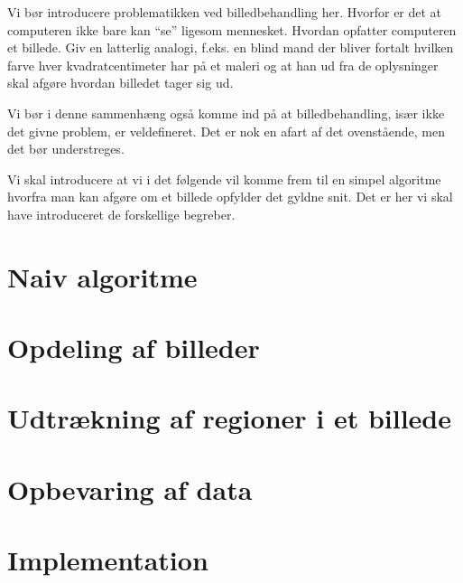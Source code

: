 {
{\sffamily Vi bør introducere problematikken ved billedbehandling her.
Hvorfor er det at computeren ikke bare kan ``se'' ligesom mennesket.
Hvordan opfatter computeren et billede. Giv en latterlig analogi, f.eks.
en blind mand der bliver fortalt hvilken farve hver kvadratcentimeter
har på et maleri og at han ud fra de oplysninger skal afgøre hvordan
billedet tager sig ud.

Vi bør i denne sammenhæng også komme ind på at billedbehandling, især
ikke det givne problem, er veldefineret. Det er nok en afart af det
ovenstående, men det bør understreges.

Vi skal introducere at vi i det følgende vil komme frem til en simpel
algoritme hvorfra man kan afgøre om et billede opfylder det gyldne snit.
Det er her vi skal have introduceret de forskellige begreber.
}

\section{Naiv algoritme\label{naiv_algoritme}}


\section{Opdeling af billeder\label{section_opdeling}}


\section{Udtrækning af regioner i et billede\label{section_udtraek}}


\section{Opbevaring af data}


\section{Implementation}


}

